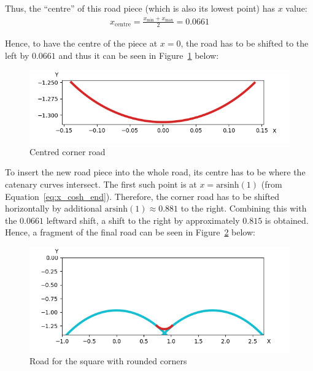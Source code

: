 \documentclass[12pt]{article}
\begin{document}
        Thus, the ``centre'' of this road piece (which is also its lowest point) has $x$ value:
        \begin{align}
            x_{\text{centre}} = \frac{x_{\text{min}}+x_{\text{max}}}{2} = 0.0661
        \end{align}

        Hence, to have the centre of the piece at $x=0$, the road has to be shifted to the left by $0.0661$ and thus it can be seen in Figure~\ref{fig:corner_road_centered} below:
        \begin{figure}[H]
            \includegraphics[width=\linewidth]{images/centered_corner_road.png}
            \caption{Centred corner road}\label{fig:corner_road_centered}
        \end{figure}

        To insert the new road piece into the whole road, its centre has to be where the catenary curves intersect. The first such point is at $x=\text{arsinh}(1)$ (from Equation~\ref{eq:x_cosh_end}). Therefore, the corner road has to be shifted horizontally by additional $\text{arsinh}(1) \approx 0.881$ to the right. Combining this with the $0.0661$ leftward shift, a shift to the right by approximately $0.815$ is obtained. Hence, a fragment of the final road can be seen in Figure~\ref{fig:corner_road_full} below:
        \begin{figure}[H]
            \includegraphics[width=\linewidth]{images/road_with_corner.png}
            \caption{Road for the square with rounded corners}\label{fig:corner_road_full}
        \end{figure}
\end{document}
